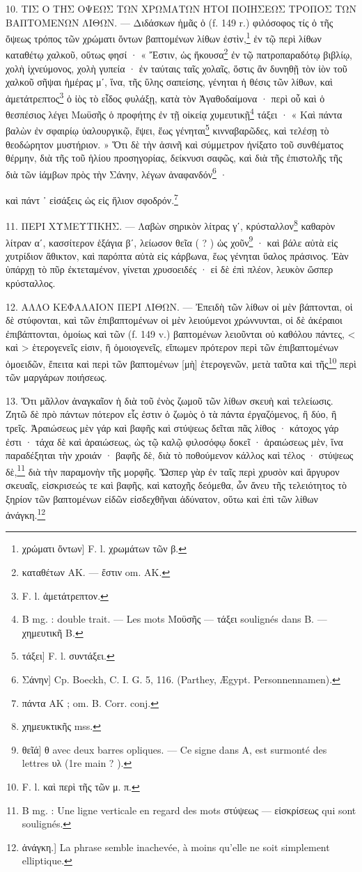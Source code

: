 \documentclass[a4paper, 11pt, oneside, polutonikogreek, french]{article}
\begin{document}
10. ΤΙΣ Ο ΤΗΣ ΟΨΕΩΣ ΤΩΝ ΧΡΩΜΑΤΩΝ ΗΤΟΙ ΠΟΙΗΣΕΩΣ ΤΡΟΠΟΣ ΤΩΝ ΒΑΠΤΟΜΕΝΩΝ ΛΙΘΩΝ. --- Διδάσκων ἡμᾶς ὁ (f. 149 r.) φιλόσοφος τίς ὁ τῆς ὄψεως τρόπος τῶν χρώματι ὄντων βαπτομένων λίθων ἐστὶν,\footnote{χρώματι ὄντων] F. l. χρωμάτων τῶν β.} ἐν τῷ περὶ λίθων καταθέτῳ χαλκοῦ, οὕτως φησί · « Ἔστιν, ὡς ἤκουσα\footnote{καταθέτων AK. --- ἔστιν om. AK.} ἐν τῷ πατροπαραδότῳ βιβλίῳ, χολὴ ἰχνεύμονος, χολὴ γυπεία · ἐν ταύταις ταῖς χολαῖς, ὅστις ἂν δυνηθῇ τὸν ἰὸν τοῦ χαλκοῦ σῆψαι ἡμέρας μʹ, ἵνα, τῆς ὕλης σαπείσης, γένηται ἡ θέσις τῶν λίθων, καὶ ἀμετάτρεπτος\footnote{F. l. ἀμετάτρεπτον.} ὁ ἰὸς τὸ εἶδος φυλάξῃ, κατὰ τὸν Ἀγαθοδαίμονα · περὶ οὗ καὶ ὁ θεσπέσιος λέγει Μωϋσῆς ὁ προφήτης ἐν τῇ οἰκείᾳ χυμευτικῇ\footnote{B mg. : double trait. --- Les mots Μοϋσῆς --- τάξει soulignés dans B. --- χημευτικῆ B.} τάξει · « Καὶ πάντα βαλὼν ἐν σφαιρίῳ ὑαλουργικῷ, ἕψει, ἕως γένηται\footnote{τάξει] F. l. συντάξει.} κινναβαρῶδες, καὶ τελέσῃ τὸ θεοδώρητον μυστήριον. » Ὅτι δὲ τὴν ἀσινῆ καὶ σύμμετρον ἠνίξατο τοῦ συνθέματος θέρμην, διὰ τῆς τοῦ ἡλίου προσηγορίας, δείκνυσι σαφῶς, καὶ διὰ τῆς ἐπιστολῆς τῆς διὰ τῶν ἰάμβων πρὸς τὴν Σάνην, λέγων ἀναφανδόν\footnote{Σάνην] Cp. Boeckh, C. I. G. 5, 116. (Parthey, Ægypt. Personnennamen).} ·

καὶ πάντ ᾽ εἰσάξεις ὡς εἰς ἥλιον σφοδρόν.\footnote{πάντα AK ; om. B. Corr. conj.}

11. ΠΕΡΙ ΧΥΜΕΥΤΙΚΗΣ. --- Λαβὼν σηρικὸν λίτρας γʹ, κρύσταλλον\footnote{χημευκτικῆς mss.} καθαρὸν λίτραν αʹ, κασσίτερον ἑξάγια βʹ, λείωσον θεῖα ( ? ) ὡς χοῦν\footnote{θεῖά] θ avec deux barres opliques. --- Ce signe dans A, est surmonté des lettres υλ (1re main ? ).} · καὶ βάλε αὐτὰ εἰς χυτρίδιον ἄθικτον, καὶ παρόπτα αὐτὰ εἰς κάρβωνα, ἕως γένηται ὕαλος πράσινος. Ἐὰν ὑπάρχῃ τὸ πῦρ ἐκτεταμένον, γίνεται χρυσοειδές · εἰ δὲ ἐπὶ πλέον, λευκὸν ὥσπερ κρύσταλλος.

12. ΑΛΛΟ ΚΕΦΑΛΑΙΟΝ ΠΕΡΙ ΛΙΘΩΝ. --- Ἐπειδὴ τῶν λίθων οἱ μὲν βάπτονται, οἱ δὲ στύφονται, καὶ τῶν ἐπιβαπτομένων οἱ μὲν λειούμενοι χρώννυνται, οἱ δὲ ἀκέραιοι ἐπιβάπτονται, ὁμοίως καὶ τῶν (f. 149 v.) βαπτομένων λειοῦνται οὐ καθόλου πάντες, < καὶ > ἑτερογενεῖς εἰσιν, ἢ ὁμοιογενεῖς, εἴπωμεν πρότερον περὶ τῶν ἐπιβαπτομένων ὁμοειδῶν, ἔπειτα καὶ περὶ τῶν βαπτομένων [μὴ] ἑτερογενῶν, μετὰ ταῦτα καὶ τῆς\footnote{F. l. καὶ περὶ τῆς τῶν μ. π.} περὶ τῶν μαργάρων ποιήσεως.

13. Ὅτι μᾶλλον ἀναγκαῖον ἡ διὰ τοῦ ἐνὸς ζωμοῦ τῶν λίθων σκευὴ καὶ τελείωσις. Ζητῶ δὲ πρὸ πάντων πότερον εἷς ἐστιν ὁ ζωμὸς ὁ τὰ πάντα ἐργαζόμενος, ἢ δύο, ἢ τρεῖς. Ἀραιώσεως μὲν γάρ καὶ βαφῆς καὶ στύψεως δεῖται πᾶς λίθος · κάτοχος γάρ ἐστι · τάχα δὲ καὶ ἀραιώσεως, ὡς τῷ καλῷ φιλοσόφῳ δοκεῖ · ἀραιώσεως μὲν, ἵνα παραδέξηται τὴν χροιάν · βαφῆς δὲ, διὰ τὸ ποθούμενον κάλλος καὶ τέλος · στύψεως δὲ,\footnote{B mg. : Une ligne verticale en regard des mots στύψεως --- εἰσκρίσεως qui sont soulignés.} διὰ τὴν παραμονὴν τῆς μορφῆς. Ὥσπερ γὰρ ἐν ταῖς περὶ χρυσὸν καὶ ἄργυρον σκευαῖς, εἰσκρισεώς τε καὶ βαφῆς, καὶ κατοχῆς δεόμεθα, ὧν ἄνευ τῆς τελειότητος τὸ ξηρίον τῶν βαπτομένων εἰδῶν εἰσδεχθῆναι ἀδύνατον, οὕτω καὶ ἐπὶ τῶν λίθων ἀνάγκη.\footnote{ἀνάγκη.] La phrase semble inachevée, à moins qu'elle ne soit simplement elliptique.}
\end{document}
